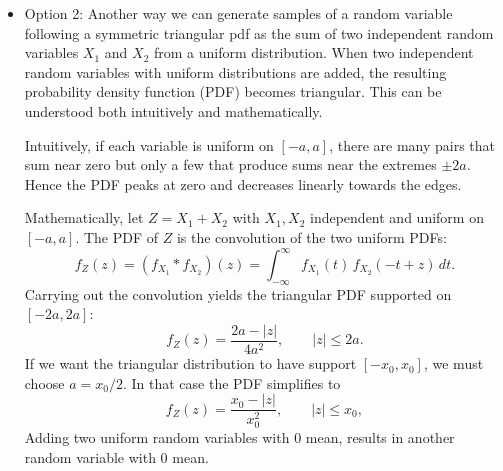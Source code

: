\documentclass[11pt,a4paper]{article}
\begin{document}
\begin{itemize}
\begin{lstlisting}[language=Matlab]
            % comprobaciones rapidas
            emp_mean = mean(samples);
            emp_var = var(samples);
            emp_desv_std = std(samples);

            % valores teoricos
            % theo_mean = 0; % simetria centrado en 0
            theo_var = (A^2 + B^2 + C^2 - A*B - A*C - B*C)/18;
            rms = 20*log10(sqrt(theo_var)/x0);

            fprintf('Theorical mean: 0; emp mean: %.2f\n',emp_mean);
            fprintf('Theorical var: %.2f; emp var: %.2f\n',theo_var,emp_var);
            fprintf('Sigma value: %.2f\n',sqrt(theo_var));
            fprintf('rms value in dBFS: %.2f\n',rms)

            % ver histograma y pdf teorica
            xgrid = linspace(A,C,500)';
            figure
            histogram(samples,100,'Normalization','pdf')
            hold on
            plot(xgrid, pdf(pd,xgrid), 'LineWidth',1.5)
            title('Triangular (media 0) -- muestras vs PDF')
            hold off
        \end{lstlisting}

    \item Option 2: Another way we can generate samples of a random variable following a symmetric triangular pdf as the sum of two independent random variables $X_1$ and $X_2$ from a uniform distribution.
          When two independent random variables with uniform distributions are added, the resulting probability density function (PDF) becomes triangular. This can be understood both intuitively and mathematically.

          Intuitively, if each variable is uniform on \([-a,a]\), there are many pairs that sum near zero but only a few that produce sums near the extremes \(\pm 2a\). Hence the PDF peaks at zero and decreases linearly towards the edges.

          Mathematically, let \(Z = X_1 + X_2\) with \(X_1,X_2\) independent and uniform on \([-a,a]\). The PDF of \(Z\) is the convolution of the two uniform PDFs:
          \[
              f_Z(z) = (f_{X_1} * f_{X_2})(z) = \int_{-\infty}^{\infty} f_{X_1}(t)\, f_{X_2}(-t + z)\, dt.
          \]
          Carrying out the convolution yields the triangular PDF supported on \([-2a,2a]\):
          \[
              f_Z(z) = \frac{2a - |z|}{4a^{2}}, \qquad |z|\le 2a.
          \]
          If we want the triangular distribution to have support \([-x_0,x_0]\), we must choose \(a = x_0/2\). In that case the PDF simplifies to
          \[
              f_Z(z)=\frac{x_0 - |z|}{x_0^2}, \qquad |z|\le x_0,
          \]
          Adding two uniform random variables with 0 mean, results in another random variable with 0 mean.


\end{itemize}
\end{document}
